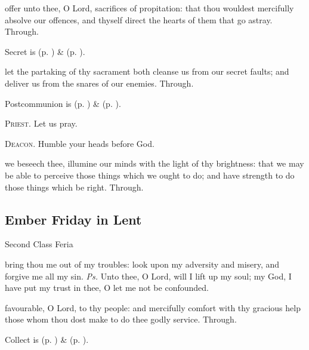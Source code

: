 \vspace{-0.25\baselineskip}

\secret
{} offer unto thee, O Lord, sacrifices of propitation: that thou wouldest mercifully absolve our offences, and thyself direct the hearts of them that go astray. Through.
\begin{rubric}
     Secret is  (p. \pageref{SPSaints}) \&   (p. \pageref{SPLivingDeparted}).
\end{rubric}


\postcommunion
{} let the partaking of thy sacrament both cleanse us from our secret faults; and deliver us from the snares of our enemies. Through.


\begin{rubric}
     Postcommunion is  (p. \pageref{SPSaints}) \&   (p. \pageref{SPLivingDeparted}).
\end{rubric}

\textsc{Priest.} Let us pray.\par
\textsc{Deacon.} Humble your heads before God.\par
{} we beseech thee, illumine our minds with the light of thy brightness: that we may be able to perceive those things which we ought to do; and have strength to do those things which be right. Through.


\subsection{Ember Friday in Lent}
\begin{inhead}
{Second Class Feria}
\end{inhead}


\introit
{} bring thou me out of my troubles: look upon my adversity and misery, and forgive me all my sin. \textit{Ps.} Unto thee, O Lord, will I lift up my soul; my God, I have put my trust in thee, O let me not be confounded.

\collect
{} favourable, O Lord, to thy people: and mercifully comfort with thy gracious help those whom thou dost make to do thee godly service. Through.
\begin{rubric}
     Collect is  (p. \pageref{SPSaints}) \&   (p. \pageref{SPLivingDeparted}).
\end{rubric}

